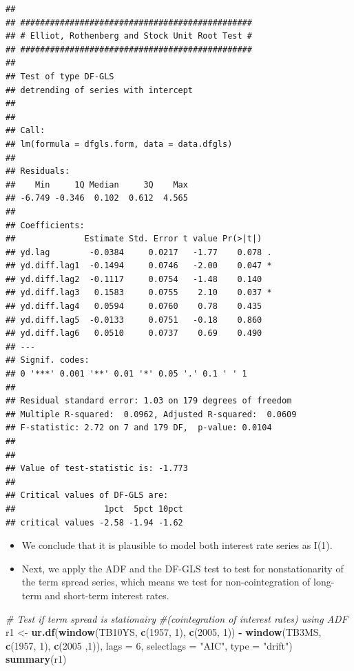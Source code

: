 \documentclass[]{book}
\newenvironment{Shaded}{\begin{snugshade}}{\end{snugshade}}
\newcommand{\CommentTok}[1]{\textcolor[rgb]{0.56,0.35,0.01}{\textit{#1}}}
\newcommand{\DataTypeTok}[1]{\textcolor[rgb]{0.13,0.29,0.53}{#1}}
\newcommand{\DecValTok}[1]{\textcolor[rgb]{0.00,0.00,0.81}{#1}}
\newcommand{\KeywordTok}[1]{\textcolor[rgb]{0.13,0.29,0.53}{\textbf{#1}}}
\newcommand{\NormalTok}[1]{#1}
\newcommand{\OperatorTok}[1]{\textcolor[rgb]{0.81,0.36,0.00}{\textbf{#1}}}
\newcommand{\StringTok}[1]{\textcolor[rgb]{0.31,0.60,0.02}{#1}}
\begin{document}
\begin{verbatim}
## 
## ############################################### 
## # Elliot, Rothenberg and Stock Unit Root Test # 
## ############################################### 
## 
## Test of type DF-GLS 
## detrending of series with intercept 
## 
## 
## Call:
## lm(formula = dfgls.form, data = data.dfgls)
## 
## Residuals:
##    Min     1Q Median     3Q    Max 
## -6.749 -0.346  0.102  0.612  4.565 
## 
## Coefficients:
##              Estimate Std. Error t value Pr(>|t|)  
## yd.lag        -0.0384     0.0217   -1.77    0.078 .
## yd.diff.lag1  -0.1494     0.0746   -2.00    0.047 *
## yd.diff.lag2  -0.1117     0.0754   -1.48    0.140  
## yd.diff.lag3   0.1583     0.0755    2.10    0.037 *
## yd.diff.lag4   0.0594     0.0760    0.78    0.435  
## yd.diff.lag5  -0.0133     0.0751   -0.18    0.860  
## yd.diff.lag6   0.0510     0.0737    0.69    0.490  
## ---
## Signif. codes:  
## 0 '***' 0.001 '**' 0.01 '*' 0.05 '.' 0.1 ' ' 1
## 
## Residual standard error: 1.03 on 179 degrees of freedom
## Multiple R-squared:  0.0962, Adjusted R-squared:  0.0609 
## F-statistic: 2.72 on 7 and 179 DF,  p-value: 0.0104
## 
## 
## Value of test-statistic is: -1.773 
## 
## Critical values of DF-GLS are:
##                  1pct  5pct 10pct
## critical values -2.58 -1.94 -1.62
\end{verbatim}

\begin{itemize}
\item
  We conclude that it is plausible to model both interest rate series as I(1).
\item
  Next, we apply the ADF and the DF-GLS test to test for nonstationarity of the term spread series, which means we test for non-cointegration of long-term and short-term interest rates.
\end{itemize}

\begin{Shaded}
\begin{Highlighting}[]
\CommentTok{# Test if term spread is stationairy }
\CommentTok{#(cointegration of interest rates) using ADF}
\NormalTok{r1 <-}\StringTok{ }\KeywordTok{ur.df}\NormalTok{(}\KeywordTok{window}\NormalTok{(TB10YS, }\KeywordTok{c}\NormalTok{(}\DecValTok{1957}\NormalTok{, }\DecValTok{1}\NormalTok{), }\KeywordTok{c}\NormalTok{(}\DecValTok{2005}\NormalTok{, }\DecValTok{1}\NormalTok{)) }\OperatorTok{-}\StringTok{ }\KeywordTok{window}\NormalTok{(TB3MS, }\KeywordTok{c}\NormalTok{(}\DecValTok{1957}\NormalTok{, }\DecValTok{1}\NormalTok{), }\KeywordTok{c}\NormalTok{(}\DecValTok{2005}\NormalTok{ ,}\DecValTok{1}\NormalTok{)), }
            \DataTypeTok{lags =} \DecValTok{6}\NormalTok{, }
            \DataTypeTok{selectlags =} \StringTok{"AIC"}\NormalTok{, }
            \DataTypeTok{type =} \StringTok{"drift"}\NormalTok{)}
\KeywordTok{summary}\NormalTok{(r1)}
\end{Highlighting}
\end{Shaded}
\end{document}
